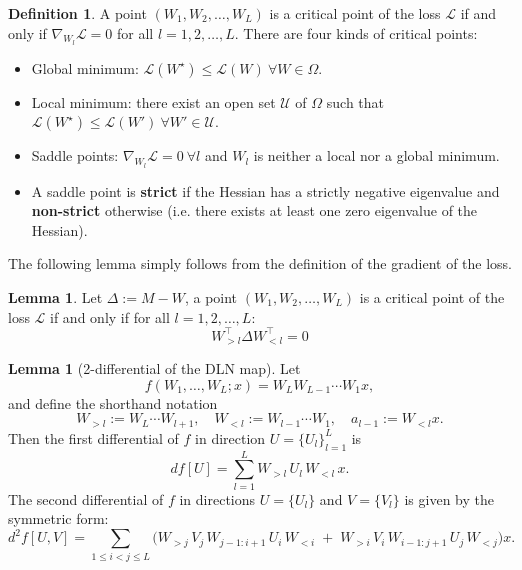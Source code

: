 \documentclass{article}
\theoremstyle{definition}
\newtheorem{lemma}[theorem]{Lemma}
\newtheorem{definition}[theorem]{Definition}
\begin{document}
\begin{definition}\label{def:critical-point}
    A point $(W_1, W_2, \ldots, W_L)$ is a critical point of the loss $\mathcal{L}$ if and only if $\nabla_{W_l} \mathcal{L} = 0$ for all $l = 1, 2, \ldots, L$. There are four kinds of critical points:
    \begin{itemize}
        \item Global minimum: $\mathcal{L}(W^{\star}) \leq \mathcal{L}(W) \ \forall W\in \Omega$.
        \item Local minimum: there exist an open set $\mathcal{U}$ of $\Omega$ such that $\mathcal{L}(W^{\star}) \leq \mathcal{L}(W') \ \forall W' \in \mathcal{U}$.
        \item Saddle points: $\nabla_{W_l} \mathcal{L} = 0 \ \forall l$ and $W_l$ is neither a local nor a global minimum.
        \item A saddle point is \textbf{strict} if the Hessian has a strictly negative eigenvalue and \textbf{non-strict} otherwise (i.e. there exists at least one zero eigenvalue of the Hessian).
    \end{itemize}
\end{definition}
The following lemma simply follows from the definition of the gradient of the loss.
\begin{lemma}\label{lem:critical-point-condition}
    Let $\Delta:= M - W$, a point $(W_1, W_2, \ldots, W_L)$ is a critical point of the loss $\mathcal{L}$ if and only if for all $l = 1, 2, \ldots, L$:
    \begin{equation*}
        W_{>l}^{\top} \Delta W_{<l}^{\top} = 0
    \end{equation*}
\end{lemma}
\begin{lemma}[2-differential of the DLN map]\label{lem:second-differential}
Let
\[
f(W_1,\ldots,W_L;x) = W_L W_{L-1} \cdots W_1 x,
\]
and define the shorthand notation
\[
W_{>l} := W_L \cdots W_{l+1}, \quad
W_{<l} := W_{l-1} \cdots W_1, \quad
a_{l-1} := W_{<l} x.
\]
Then the first differential of $f$ in direction $U = \{U_l\}_{l=1}^L$ is
\begin{equation*}
    df[U] = \sum_{l=1}^L W_{>l}\, U_l\, W_{<l}\, x.
\end{equation*}
The second differential of $f$ in directions $U = \{U_l\}$ and $V = \{V_l\}$ is given by the symmetric form:
\begin{equation*}
    \boxed{
    d^2 f[U, V]
    = \sum_{1 \le i < j \le L}
    \Big(
        W_{>j}\, V_j\, W_{j-1:i+1}\, U_i\, W_{<i}
        \;+\;
        W_{>i}\, V_i\, W_{i-1:j+1}\, U_j\, W_{<j}
    \Big)x. }
\end{equation*}
\end{lemma}
\end{document}
